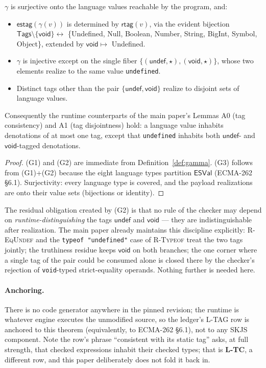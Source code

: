 \documentclass[11pt]{article}
\newcommand{\Tags}{\mathsf{Tags}}
\newcommand{\rtag}{\mathsf{rtag}}
\newcommand{\ESVal}{\mathsf{ESVal}}
\newcommand{\estag}{\mathsf{estag}}
\newcommand{\realize}{\gamma}
\newcommand{\ecma}[1]{ECMA-262 \S#1}
\begin{document}
\begin{theorem}
\label{thm:tags}
$\realize$ is surjective onto the language values reachable by the
program, and:
\begin{itemize}
\item[(G1)] $\estag(\realize(v))$ is determined by $\rtag(v)$, via the
  evident bijection
  $\Tags \setminus \{\mathsf{void}\} \leftrightarrow$
  \{Undefined, Null, Boolean, Number, String, BigInt, Symbol, Object\},
  extended by $\mathsf{void} \mapsto$ Undefined.
\item[(G2)] $\realize$ is injective except on the single fiber
  $\{(\mathsf{undef},\star), (\mathsf{void},\star)\}$, whose two elements
  realize to the same value \texttt{undefined}.
\item[(G3)] Distinct tags other than the pair
  $\{\mathsf{undef}, \mathsf{void}\}$ realize to disjoint sets of
  language values.
\end{itemize}
Consequently the runtime counterparts of the main paper's Lemmas A0 (tag
consistency) and A1 (tag disjointness) hold: a language value inhabits
denotations of at most one tag, except that \texttt{undefined} inhabits
both $\mathsf{undef}$- and $\mathsf{void}$-tagged denotations.
\end{theorem}
\begin{proof}
(G1) and (G2) are immediate from Definition~\ref{def:gamma}. (G3) follows
from (G1)+(G2) because the eight language types partition $\ESVal$
(\ecma{6.1}). Surjectivity: every language type is covered, and the
payload realizations are onto their value sets (bijections or identity).
\end{proof}

The residual obligation created by (G2) is that no rule of the checker
may depend on \emph{runtime-distinguishing} the tags $\mathsf{undef}$ and
$\mathsf{void}$ — they are indistinguishable after realization. The main
paper already maintains this discipline explicitly: \textsc{R-EqUndef}
and the \texttt{typeof "undefined"} case of \textsc{R-Typeof} treat the
two tags jointly; the truthiness residue keeps $\mathsf{void}$ on both
branches; the one corner where a single tag of the pair could be consumed
alone is closed there by the checker's rejection of
\texttt{void}-typed strict-equality operands. Nothing further is needed
here.

\paragraph{Anchoring.}
There is no code generator anywhere in the pinned revision; the runtime
is whatever engine executes the unmodified source, so the ledger's L-TAG
row is anchored to this theorem (equivalently, to \ecma{6.1}), not to any
SKJS component. Note the row's phrase ``consistent with its static tag''
asks, at full strength, that checked expressions inhabit their checked
types; that is \textbf{L-TC}, a different row, and this paper
deliberately does not fold it back in.
\end{document}
